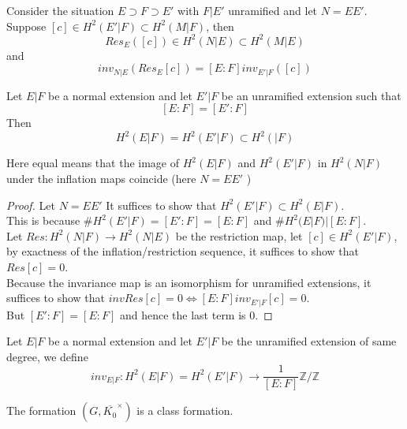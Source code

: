 \documentclass[../main.tex]{subfiles}
\begin{document}
\begin{lemma}
Consider the situation $E\supset F\supset E'$ with $F|E'$ unramified and let $N= EE'$.\\
Suppose $[c] \in H^{2}( E'|F) \subset H^{2}( M|F) $, then 
\[ 
Res_E( [ c] ) \in H^{2}( N|E) \subset H^{2}( M|E) 
\]
and
\[ 
inv_{N|E} ( Res_E [ c] ) = [ E:F] inv_{E'|F} ( [ c] ) 
\]

\end{lemma}
\begin{thm}
Let $E|F$ be a normal extension and let $E'|F$ be an unramified extension such that 
\[ 
[ E:F] = [ E':F] 
\]
Then 
\[ 
H^{2}( E|F) = H^{2}( E'|F) \subset H^{2}( |F) 
\]

Here equal means that the image of $H^{2}( E|F) $ and $H^{2}( E'|F) $ in $H^{2}( N|F) $ under the inflation maps coincide (here $N= EE'$ ) 

\end{thm}
\begin{proof}
	Let $N= EE'$ 
It suffices to show that $H^{2}( E'|F) \subset H^{2}( E|F) $.\\
This is because $\# H^{2}( E'|F) = [ E':F] = [ E:F] $ and $\# H^{2}( E|F) | [ E:F] $.\\
Let $Res: H^{2}( N|F) \to H^{2}( N|E)  $ be the restriction map, let $[c] \in H^{2}( E'|F) $, by exactness of the inflation/restriction sequence, it suffices to show that $Res [ c] =0$.\\
Because the invariance map is an isomorphism for unramified extensions, it suffices to show that $inv Res [ c] =0 \iff [ E:F] inv_{E'|F} [ c] =0$.\\
But $[E':F] = [ E:F] $ and hence the last term is 0.
\end{proof}
\begin{defn}
	Let $E|F$ be a normal extension and let $E'|F$ be the unramified extension of same degree, we define
	\[ 
		inv_{E|F} : H^{2}( E|F) =H^{2}( E'|F) \to \frac{1}{[E:F]} \mathbb{Z} /\mathbb{Z}
	\]
	
\end{defn}
\begin{thm}
	The formation $( G, \overline{K_0}^{\times}) $ 	is a class formation.
\end{thm}
\end{document}
